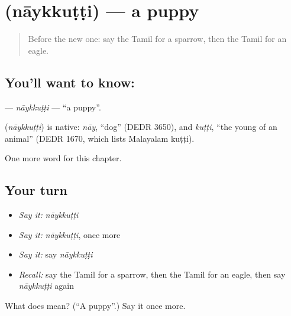 \section[\texorpdfstring{\ta{நாய்க்குட்டி} (nāykkuṭṭi)}{நாய்க்குட்டி (nāykkuṭṭi)}]{ (nāykkuṭṭi) — a puppy}

\label{lesson:TA-C247-naykkutti}



\begin{quote}
Before the new one: say the Tamil for a sparrow, then the Tamil for an eagle.
\end{quote}

\subsection*{You'll want to know: }
\textbf{} — \emph{nāykkuṭṭi} — \textquotedblleft{}a puppy\textquotedblright{}.

\begin{cousinweb}
\textbf{} (\emph{nāykkuṭṭi}) is native: \emph{nāy}, \textquotedblleft{}dog\textquotedblright{} (DEDR 3650), and \emph{kuṭṭi}, \textquotedblleft{}the young of an animal\textquotedblright{} (DEDR 1670, which lists Malayalam kuṭṭi).
\end{cousinweb}

\begin{grammarlens}[title={What you've built}]
One more word for this chapter.
\end{grammarlens}

\subsection*{Your turn}
\begin{itemize}
\raggedright
  \item \emph{Say it:} \emph{nāykkuṭṭi}
  \item \emph{Say it:} \emph{nāykkuṭṭi}, once more
  \item \emph{Say it:} say \emph{nāykkuṭṭi}
  \item \emph{Recall:} say the Tamil for a sparrow, then the Tamil for an eagle, then say \emph{nāykkuṭṭi} again
\end{itemize}

\begin{tcolorbox}[breakable,colback=teal!4,colframe=teal!35!black,title={Before you move on}]
What does  mean? (\textquotedblleft{}A puppy\textquotedblright{}.) Say it once more.
\end{tcolorbox}

